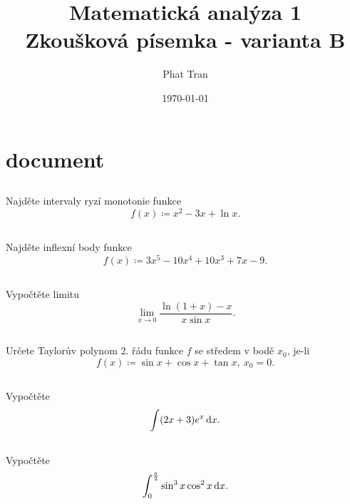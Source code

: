 \documentclass[12pt]{article}
\title{\Huge{\textbf{Matematická analýza 1}} \\ \huge{Zkoušková písemka - varianta B}}
\author{Phat Tran}
\date{\today}
\begin{document}
\maketitle
\thispagestyle{empty}
\setcounter{page}{0}
\newpage

\section{document}

    \subsection{}
    \begin{tcolorbox}
        Najděte intervaly ryzí monotonie funkce
        $$ f(x) \coloneq x^2 - 3x +\ln{x} . $$
    \end{tcolorbox}
    
    \pagebreak
    
    \subsection{}
    \begin{tcolorbox}
        Najděte inflexní body funkce
        $$ f(x) \coloneq 3x^5 - 10x^4 + 10x^3 + 7x - 9 . $$
    \end{tcolorbox}
    
    \pagebreak

    \subsection{}
    \begin{tcolorbox}
        Vypočtěte limitu
        $$ \lim_{x \rightarrow 0} \frac{\ln{(1 + x)} - x}{x\sin{x}} . $$
    \end{tcolorbox}
    
    \pagebreak

    \subsection{}
    \begin{tcolorbox}
        Určete Taylorův polynom 2. řádu funkce $f$ se středem v bodě $x_0$, je-li
        $$ f(x) \coloneq \sin{x} + \cos{x} + \tan{x},\ x_0 = 0 . $$
    \end{tcolorbox}
    
    \pagebreak

    \subsection{}
    \begin{tcolorbox}
        Vypočtěte
        $$ \int (2x + 3)e^x \mathop{}\!\mathrm{d}{x} . $$
    \end{tcolorbox}
    
    \pagebreak

    \subsection{}
    \begin{tcolorbox}
        Vypočtěte
        $$ \int_{0}^{\frac{\pi}{2}} \sin^3{x}\cos^2{x} \mathop{}\!\mathrm{d}{x} . $$
    \end{tcolorbox}
    
    \pagebreak

    \subsection{}
    
    
\end{document}
